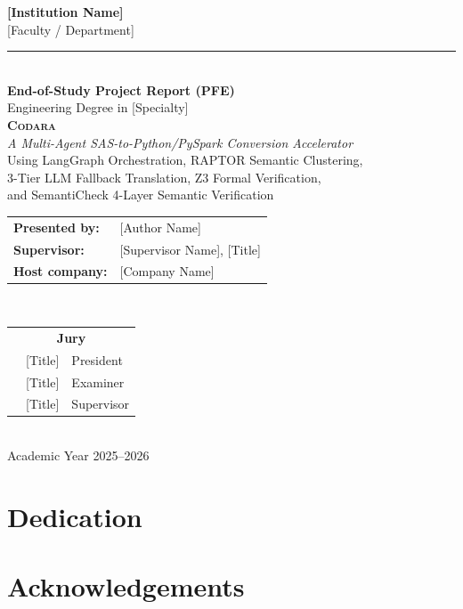 \documentclass[12pt,a4paper]{report}
\newcommand{\codara}{\textsc{Codara}}
\begin{document}

\begin{titlepage}
  \centering
  \vspace*{1cm}
  {\large \textbf{[Institution Name]}}\\[0.4cm]
  {\large [Faculty / Department]}\\[0.5cm]
  \rule{\linewidth}{0.5pt}\\[0.5cm]
  {\Large \textbf{End-of-Study Project Report (PFE)}}\\[0.3cm]
  {\large Engineering Degree in [Specialty]}\\[1.2cm]
  {\LARGE \textbf{\codara{}}}\\[0.5cm]
  {\large \textit{A Multi-Agent SAS-to-Python/PySpark Conversion Accelerator}}\\[0.3cm]
  {\normalsize Using LangGraph Orchestration, RAPTOR Semantic Clustering,}\\
  {\normalsize 3-Tier LLM Fallback Translation, Z3 Formal Verification,}\\
  {\normalsize and SemantiCheck 4-Layer Semantic Verification}\\[2cm]
  \begin{tabular}{ll}
    \textbf{Presented by:} & [Author Name] \\[0.3cm]
    \textbf{Supervisor:}   & [Supervisor Name], [Title] \\[0.3cm]
    \textbf{Host company:} & [Company Name] \\
  \end{tabular}\\[2cm]
  \begin{tabular}{lll}
    \multicolumn{3}{c}{\textbf{Jury}} \\[0.3cm]
    [Name] & [Title] & President \\
    [Name] & [Title] & Examiner \\
    [Name] & [Title] & Supervisor \\
  \end{tabular}\\[2cm]
  {\large Academic Year 2025--2026}
\end{titlepage}

\chapter*{Dedication}
\thispagestyle{plain}

\chapter*{Acknowledgements}
\thispagestyle{plain}
\end{document}
